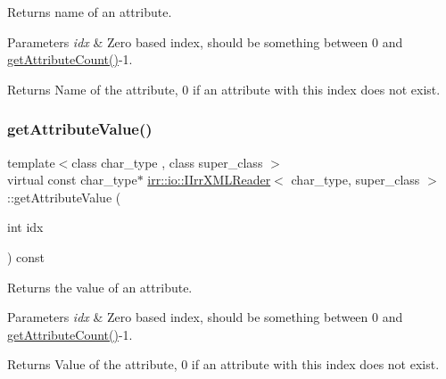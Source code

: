 Returns name of an attribute. 


\begin{DoxyParams}{Parameters}
{\em idx} & Zero based index, should be something between 0 and \hyperlink{classirr_1_1io_1_1IIrrXMLReader_a8f85253d2efb15061facdb9571b9c549}{get\+Attribute\+Count()}-\/1. \\
\hline
\end{DoxyParams}
\begin{DoxyReturn}{Returns}
Name of the attribute, 0 if an attribute with this index does not exist. 
\end{DoxyReturn}
\mbox{\label{classirr_1_1io_1_1IIrrXMLReader_a41bd71a1b9d4a80cd1d0257dedb35325}} 
\subsubsection{\texorpdfstring{get\+Attribute\+Value()}{getAttributeValue()}\hspace{0.1cm}{\footnotesize\ttfamily [1/2]}}
{\footnotesize\ttfamily template$<$class char\+\_\+type , class super\+\_\+class $>$ \\
virtual const char\+\_\+type$\ast$ \hyperlink{classirr_1_1io_1_1IIrrXMLReader}{irr\+::io\+::\+I\+Irr\+X\+M\+L\+Reader}$<$ char\+\_\+type, super\+\_\+class $>$\+::get\+Attribute\+Value (\begin{DoxyParamCaption}\item[{int}]{idx }\end{DoxyParamCaption}) const\hspace{0.3cm}{\ttfamily [pure virtual]}}



Returns the value of an attribute. 


\begin{DoxyParams}{Parameters}
{\em idx} & Zero based index, should be something between 0 and \hyperlink{classirr_1_1io_1_1IIrrXMLReader_a8f85253d2efb15061facdb9571b9c549}{get\+Attribute\+Count()}-\/1. \\
\hline
\end{DoxyParams}
\begin{DoxyReturn}{Returns}
Value of the attribute, 0 if an attribute with this index does not exist. 
\end{DoxyReturn}
\mbox{\label{classirr_1_1io_1_1IIrrXMLReader_adaac9a49b396e7fc2d335335f36391a9}} 
